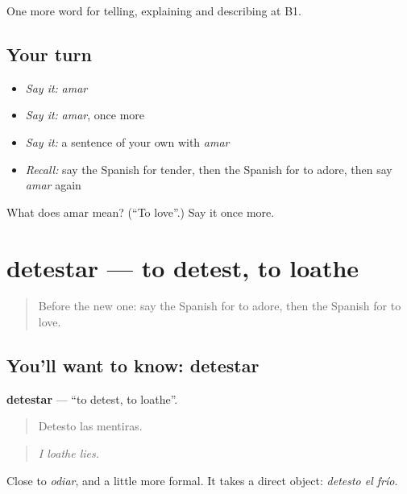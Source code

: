 \begin{grammarlens}[title={What you've built}]
One more word for telling, explaining and describing at B1.
\end{grammarlens}

\subsection*{Your turn}
\begin{itemize}
\raggedright
  \item \emph{Say it:} \emph{amar}
  \item \emph{Say it:} \emph{amar}, once more
  \item \emph{Say it:} a sentence of your own with \emph{amar}
  \item \emph{Recall:} say the Spanish for tender, then the Spanish for to adore, then say \emph{amar} again
\end{itemize}

\begin{tcolorbox}[breakable,colback=teal!4,colframe=teal!35!black,title={Before you move on}]
What does amar mean? (\textquotedblleft{}To love\textquotedblright{}.) Say it once more.
\end{tcolorbox}
\section[detestar]{detestar — to detest, to loathe}

\label{lesson:ES-C715-detestar}



\begin{quote}
Before the new one: say the Spanish for to adore, then the Spanish for to love.
\end{quote}

\subsection*{You'll want to know: detestar}
\textbf{detestar} — \textquotedblleft{}to detest, to loathe\textquotedblright{}.

\begin{quote}
Detesto las mentiras.
\end{quote}

\begin{quote}
\emph{I loathe lies.}
\end{quote}

Close to \emph{odiar}, and a little more formal. It takes a direct object: \emph{detesto el frío}.

